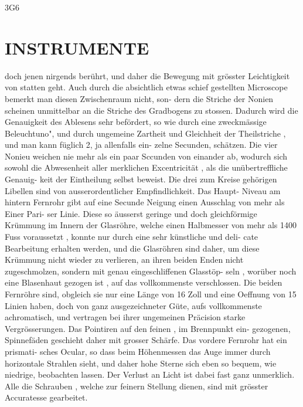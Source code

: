 \documentclass[12pt,a4paper]{article}
\begin{document}
\newpage
3G6 

\section*{INSTRUMENTE}
doch  jenen  nirgends  berührt,  und  daher  die  Bewegung  mit  grösster  Leichtigkeit  von  statten  geht.  Auch 
durch  die  absichtlich  etwas  schief  gestellten  Microscope  bemerkt  man  diesen  Zwischenraum  nicht,  son- 
dern die  Striche  der  Nonien  scheinen  unmittelbar  an  die  Striche  des  Gradbogens  zu  stossen.  Dadurch 
wird  die  Genauigkeit  des  Ablesens  sehr  befördert,  so  wie  durch  eine  zweckmässige  Beleuchtuno",  und 
durch  ungemeine  Zartheit  und  Gleichheit  der  Theilstriche ,  und  man  kann  füglich  2,  ja  allenfalls  ein- 
zelne Secunden,  schätzen.  Die  vier  Nonieu  weichen  nie  mehr  als  ein  paar  Sccunden  von  einander  ab, 
wodurch  sich  sowohl  die  Abwesenheit  aller  merklichen  Excentricität ,  als  die  unübertreffliche  Genauig- 
keit der  Eintheilung  selbst  beweist. 
Die  drei  zum  Kreise  gehörigen  Libellen  sind  von  ausserordentlicher  Empfindlichkeit.  Das  Haupt- 
Niveau  am  hintern  Fernrohr  gibt  auf  eine  Secunde  Neigung  einen  Ausschlag  von  mehr  als  Einer  Pari- 
ser Linie.  Diese  so  äusserst  geringe  und  doch  gleichförmige  Krümmung  im  Innern  der  Glasröhre,  welche 
einen  Halbmesser  von  mehr  als  1400  Fuss  voraussetzt ,  konnte  nur  durch  eine  sehr  künstliche  und  deli- 
cate  Bearbeitung  erhalten  werden,  und  die  Glasröhren  sind  daher,  um  diese  Krümmung  nicht  wieder 
zu  verlieren,  an  ihren  beiden  Enden  nicht  zugeschmolzen,  sondern  mit  genau  eingeschliffenen  Glasstöp- 
seln ,  worüber  noch  eine  Blasenhaut  gezogen  ist ,  auf  das  vollkommenste  verschlossen. 
Die  beiden  Fernröhre  sind,  obgleich  sie  nur  eine  Länge  von  16  Zoll  und  eine  Oeffnung  von  15 
Linien  haben,  doch  von  ganz  ausgezeichneter  Güte,  aufs  vollkommenste  achromatisch,  und  vertragen  bei 
ihrer  ungemeinen  Präcision  starke  Vergrösserungen.  Das  Pointiren  auf  den  feinen ,  im  Brennpunkt  ein- 
gezogenen, Spinnefäden  geschieht  daher  mit  grosser  Schärfe.  Das  vordere  Fernrohr  hat  ein  prismati- 
sches Ocular,  so  dass  beim  Höhenmessen  das  Auge  immer  durch  horizontale  Strahlen  sieht,  und  daher 
hohe  Sterne  sich  eben  so  bequem,  wie  niedrige,  beobachten  lassen.  Der  Verlust  an  Licht  ist  dabei  fast 
ganz  unmerklich. 
Alle  die  Schrauben ,  welche  zur  feinern  Stellung  dienen,  sind  mit  grösster  Accuratesse  gearbeitet. 
\end{document}
